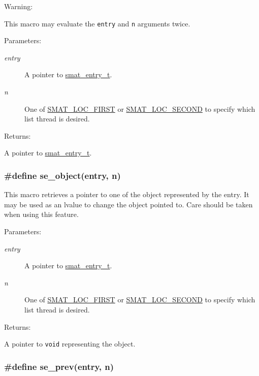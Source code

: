 \begin{Desc}
\item[Warning: ]\par
This macro may evaluate the {\tt entry} and {\tt n} arguments twice.\end{Desc}
\begin{Desc}
\item[Parameters: ]\par
\begin{description}
\item[{\em 
entry}]A pointer to \hyperlink{group__dbprim__smat_a2}{smat\_\-entry\_\-t}. \item[{\em 
n}]One of \hyperlink{group__dbprim__smat_a47a135}{SMAT\_\-LOC\_\-FIRST} or \hyperlink{group__dbprim__smat_a47a136}{SMAT\_\-LOC\_\-SECOND} to specify which list thread is desired.\end{description}
\end{Desc}
\begin{Desc}
\item[Returns: ]\par
A pointer to \hyperlink{group__dbprim__smat_a2}{smat\_\-entry\_\-t}. \end{Desc}
\hypertarget{group__dbprim__smat_a46}{
\subsubsection[se\_\-object]{\setlength{\rightskip}{0pt plus 5cm}\#define se\_\-object(entry, n)}}
\label{group__dbprim__smat_a46}


This macro retrieves a pointer to one of the object represented by the entry. It may be used as an lvalue to change the object pointed to. Care should be taken when using this feature.\begin{Desc}
\item[Parameters: ]\par
\begin{description}
\item[{\em 
entry}]A pointer to \hyperlink{group__dbprim__smat_a2}{smat\_\-entry\_\-t}. \item[{\em 
n}]One of \hyperlink{group__dbprim__smat_a47a135}{SMAT\_\-LOC\_\-FIRST} or \hyperlink{group__dbprim__smat_a47a136}{SMAT\_\-LOC\_\-SECOND} to specify which list thread is desired.\end{description}
\end{Desc}
\begin{Desc}
\item[Returns: ]\par
A pointer to {\tt void} representing the object. \end{Desc}
\hypertarget{group__dbprim__smat_a44}{
\subsubsection[se\_\-prev]{\setlength{\rightskip}{0pt plus 5cm}\#define se\_\-prev(entry, n)}}
\label{group__dbprim__smat_a44}



